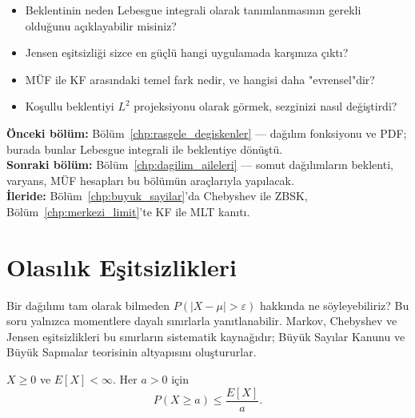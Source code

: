 \begin{ozyansima}
\begin{itemize}
  \item Beklentinin neden Lebesgue integrali olarak tanımlanmasının gerekli olduğunu açıklayabilir misiniz?
  \item Jensen eşitsizliği sizce en güçlü hangi uygulamada karşınıza çıktı?
  \item MÜF ile KF arasındaki temel fark nedir, ve hangisi daha "evrensel"dir?
  \item Koşullu beklentiyi $L^2$ projeksiyonu olarak görmek, sezginizi nasıl değiştirdi?
\end{itemize}
\end{ozyansima}

\begin{kopru}
\textbf{Önceki bölüm:} Bölüm~\ref{chp:rasgele_degiskenler} --- dağılım fonksiyonu ve PDF;
burada bunlar Lebesgue integrali ile beklentiye dönüştü.\\
\textbf{Sonraki bölüm:} Bölüm~\ref{chp:dagilim_aileleri} --- somut dağılımların
beklenti, varyans, MÜF hesapları bu bölümün araçlarıyla yapılacak.\\
\textbf{İleride:} Bölüm~\ref{chp:buyuk_sayilar}'da Chebyshev ile ZBSK,
Bölüm~\ref{chp:merkezi_limit}'te KF ile MLT kanıtı.
\end{kopru}

\section{Olasılık Eşitsizlikleri}
\label{sec:olasilik_esitsizlikleri}

\begin{motivasyon}
Bir dağılımı tam olarak bilmeden $P(|X - \mu| > \varepsilon)$ hakkında ne söyleyebiliriz?
Bu soru yalnızca momentlere dayalı sınırlarla yanıtlanabilir.
Markov, Chebyshev ve Jensen eşitsizlikleri bu sınırların sistematik kaynağıdır;
Büyük Sayılar Kanunu ve Büyük Sapmalar teorisinin altyapısını oluştururlar.
\end{motivasyon}

\begin{teorem}
\label{thm:markov_beklenti}
$X \geq 0$ ve $E[X] < \infty$. Her $a > 0$ için
\[
  P(X \geq a) \leq \frac{E[X]}{a}.
\]
\end{teorem}

